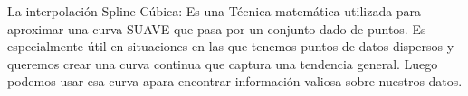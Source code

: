 La interpolación Spline Cúbica: Es una Técnica matemática utilizada para 
aproximar una curva SUAVE que pasa por un conjunto dado de puntos. Es especialmente
útil en situaciones en las que tenemos puntos de datos dispersos y queremos crear 
una curva continua que captura una tendencia general.
Luego podemos usar esa curva apara encontrar información valiosa sobre nuestros
datos. 
